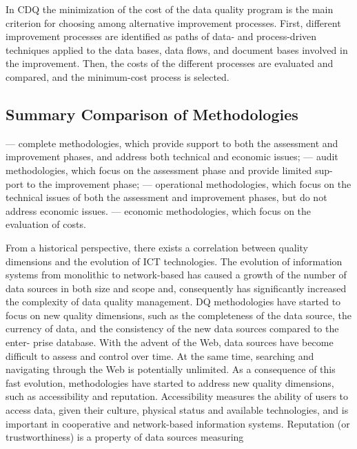 \documentclass[pdftex,english,oribibl]{llncs}
\begin{document}
    In CDQ the minimization of the cost of the data quality program is the main criterion for choosing among alternative improvement processes. First, different improvement processes are identified as paths of data- and process-driven techniques applied to the data bases, data flows, and document bases involved in the improvement. Then, the costs of the different processes are evaluated and compared, and the minimum-cost
    process is selected.
    \subsection{Summary Comparison of Methodologies}
    — complete methodologies, which provide support to both the assessment and improvement phases, and address both technical and economic issues;
    — audit methodologies, which focus on the assessment phase and provide limited sup-
    port to the improvement phase;
    — operational methodologies, which focus on the technical issues of both the assessment and improvement phases, but do not address economic issues.
    — economic methodologies, which focus on the evaluation of costs.

    From a historical perspective, there exists a correlation between quality dimensions and the evolution of ICT technologies.
    The evolution of information systems from monolithic to network-based has caused a growth of the number of data sources in both size and scope and, consequently has significantly increased the complexity of data quality management. DQ methodologies have started to focus on new quality dimensions, such as the completeness of the data source, the currency of data, and the consistency of the new data sources compared to the enter- prise database. With the advent of the Web, data sources have become difficult to assess and control over time. At the same time, searching and navigating through the Web is potentially unlimited. As a consequence of this fast evolution, methodologies have started to address new quality dimensions, such as accessibility and reputation. Accessibility measures the ability of users to access data, given their culture, physical status and available technologies, and is important in cooperative and network-based information systems. Reputation (or trustworthiness) is a property of data sources measuring
\end{document}
